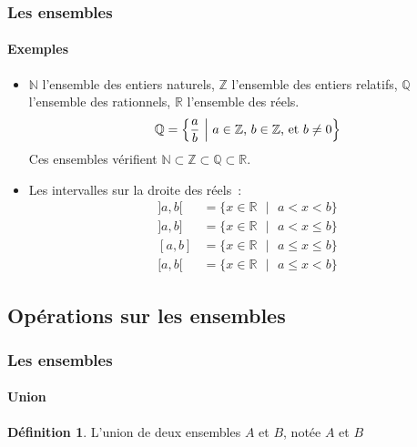 \documentclass[10pt,notheorems]{beamer}
\theoremstyle{plain}
\theoremstyle{definition} %
\newtheorem{definition}{Définition}
\begin{document}
\begin{frame}
  \frametitle{Les ensembles}
  \framesubtitle{Exemples}
  
  \begin{itemize}

  \item $\mathbb N$ l'ensemble des entiers naturels, $\mathbb Z$
    l'ensemble des entiers relatifs, $\mathbb Q$ l'ensemble des
    rationnels, $\mathbb R$ l'ensemble des réels.
    \[
      \mathbb Q = \left\{ \frac{a}{b}\text{ }\Bigl|\text{ }a\in\mathbb Z\text{, }b\in\mathbb Z\text{, et }b\neq 0\right\}
    \]
    Ces ensembles vérifient $\mathbb N \subset \mathbb Z \subset \mathbb Q \subset \mathbb R$.\newline
    
  \item Les intervalles sur la droite des réels :
    \[
      \begin{split}
        ]a,b[ &= \{x\in\mathbb R\text{ }|\text{ }a<x<b\}\\
        ]a,b] &= \{x\in\mathbb R\text{ }|\text{ }a<x\leq b\}\\
        [a,b] &= \{x\in\mathbb R\text{ }|\text{ }a\leq x\leq b\}\\
        [a,b[ &= \{x\in\mathbb R\text{ }|\text{ }a\leq x< b\}
      \end{split}
    \]
      
  \end{itemize}

\end{frame}

\subsection{Opérations sur les ensembles}


\begin{frame}
  \frametitle{Les ensembles}
  \framesubtitle{Union}
  
  \begin{definition} L'union de deux ensembles $A$ et $B$, notée $A$ et $B$
    
  \end{definition}

  
\end{frame}
\end{document}
